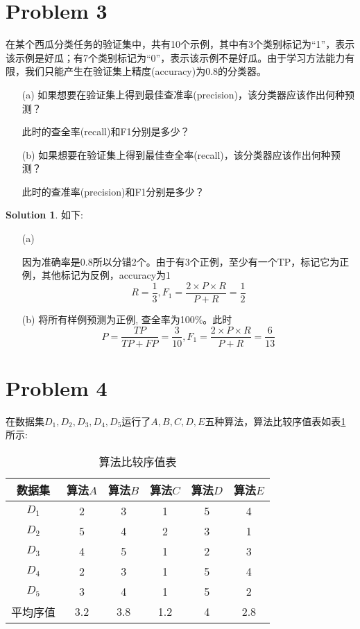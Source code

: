 \documentclass[a4paper,UTF8]{article}
\theoremstyle{definition}
\newtheorem*{solution}{Solution}
\begin{document}
\section*{Problem 3} 
在某个西瓜分类任务的验证集中，共有10个示例，其中有3个类别标记为“1”，表示该示例是好瓜；有7个类别标记为“0”，表示该示例不是好瓜。由于学习方法能力有限，我们只能产生在验证集上精度(accuracy)为0.8的分类器。
\begin{itemize}
\item[(a)] 如果想要在验证集上得到最佳查准率(precision)，该分类器应该作出何种预测？

此时的查全率(recall)和F1分别是多少？
\item[(b)] 如果想要在验证集上得到最佳查全率(recall)，该分类器应该作出何种预测？

此时的查准率(precision)和F1分别是多少？
\end{itemize}
\begin{solution}
如下:
\begin{itemize}
\item[(a)] {因为准确率是0.8所以分错2个。由于有3个正例，至少有一个TP，标记它为正例，其他标记为反例，accuracy为1
$$ R =\frac{1}{3}, F_1 = \frac{2 \times P\times R }{P+R} = \frac{1}{2} $$ 

 }
\item[(b)] {将所有样例预测为正例, 查全率为100\%。此时\\

$$ P = \frac{TP}{TP+FP} = \frac{3}{10}, F_1 = \frac{2 \times P\times R }{P+R} = \frac{6}{13} $$ 
}
\end{itemize}

\end{solution}

\section*{Problem 4} 
在数据集$D_1,D_2,D_3,D_4,D_5$运行了$A,B,C,D,E$五种算法，算法比较序值表如表\ref{table:ranking}所示:
\begin{table}[h]
\centering
\caption{算法比较序值表} \vspace{2mm}\label{table:ranking}
\begin{tabular}{c|c c c c c}\hline
数据集 & 算法$A$ & 算法$B$  & 算法$C$  &算法$D$  &算法$E$ \\
\hline
$D_1$ & 2  & 3 &  1 &  5  & 4\\
$D_2$ & 5  & 4 &  2 &  3  & 1\\
$D_3$ & 4  & 5 &  1 &  2  & 3\\
$D_4$ & 2  & 3 &  1 &  5  & 4\\
$D_5$ & 3  & 4 &  1 &  5  & 2\\
\hline
平均序值 & 3.2 &  3.8 & 1.2 &  4 &  2.8 \\
\hline
\end{tabular}
\end{table}
\end{document}
